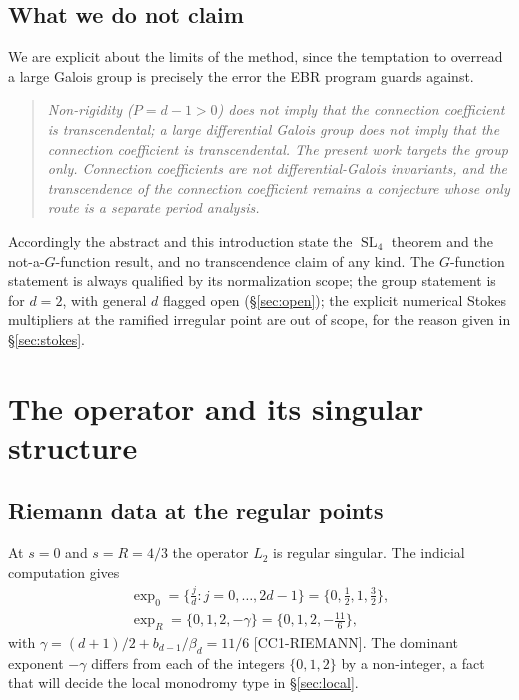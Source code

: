 \documentclass[11pt,reqno]{amsart}
\theoremstyle{plain}
\theoremstyle{definition}
\theoremstyle{remark}
\newcommand{\SL}{\operatorname{SL}}
\newcommand{\Ltwo}{L_{2}}
\newcommand{\claim}[1]{\textsf{\small[#1]}}
\begin{document}
\subsection{What we do not claim}\label{sec:nonclaim}
We are explicit about the limits of the method, since the temptation to
overread a large Galois group is precisely the error the EBR program guards
against.
\begin{quote}\itshape
Non-rigidity ($P=d-1>0$) does not imply that the connection coefficient is
transcendental; a large differential Galois group does not imply that the
connection coefficient is transcendental. The present work targets the
\emph{group} only. Connection coefficients are not differential-Galois
invariants, and the transcendence of the connection coefficient remains a
conjecture whose only route is a separate period analysis.
\end{quote}
Accordingly the abstract and this introduction state the $\SL_{4}$ theorem and
the not-a-$G$-function result, and no transcendence claim of any kind. The
$G$-function statement is always qualified by its normalization scope; the
group statement is for $d=2$, with general $d$ flagged open
(\S\ref{sec:open}); the explicit numerical Stokes multipliers at the ramified
irregular point are out of scope, for the reason given in
\S\ref{sec:stokes}.

\section{The operator and its singular structure}\label{sec:operator}

\subsection{Riemann data at the regular points}
At $s=0$ and $s=R=4/3$ the operator $\Ltwo$ is regular singular. The
indicial computation gives
\begin{equation}\label{eq:riemann}
\begin{gathered}
  \exp_{0}=\Big\{\tfrac{j}{d}:j=0,\dots,2d-1\Big\}=\{0,\tfrac12,1,\tfrac32\},\\
  \exp_{R}=\{0,1,2,-\gamma\}=\{0,1,2,-\tfrac{11}{6}\},
\end{gathered}
\end{equation}
with $\gamma=(d+1)/2+b_{d-1}/\beta_{d}=11/6$ \claim{CC1-RIEMANN}. The dominant
exponent $-\gamma$ differs from each of the integers $\{0,1,2\}$ by a
non-integer, a fact that will decide the local monodromy type in
\S\ref{sec:local}.
\end{document}

